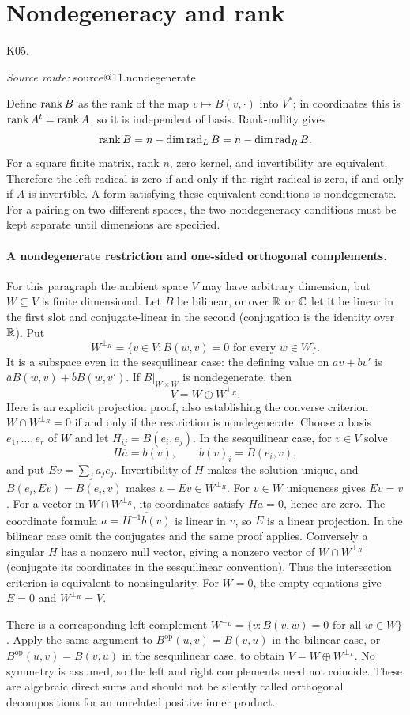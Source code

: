 \documentclass[11pt,a4paper]{book}
\makeatletter
\theoremstyle{definition}\newtheorem{definition}[theorem]{Definition}
\theoremstyle{remark}\newtheorem{remark}[theorem]{Remark}
\newcommand{\Kentry}[2]{\section{#2}\label{k:#1}\noindent\textsf{\small K05.\detokenize{#1}}\par
  \begingroup\small\color{black!65}\textit{Source route: }\csname source@#1\endcsname\par\endgroup}
\makeatother
\begin{document}
\Kentry{11.nondegenerate}{Nondegeneracy and rank}
Define $\operatorname{rank} B$ as the rank of the map $v\mapsto B(v,\cdot)$ into $V^*$; in coordinates this is $\operatorname{rank} A^t=\operatorname{rank} A$, so it is independent of basis. Rank-nullity gives
\[\operatorname{rank} B=n-\dim\operatorname{rad}_L B=n-\dim\operatorname{rad}_R B.
\]
For a square finite matrix, rank $n$, zero kernel, and invertibility are equivalent. Therefore the left radical is zero if and only if the right radical is zero, if and only if $A$ is invertible. A form satisfying these equivalent conditions is nondegenerate. For a pairing on two different spaces, the two nondegeneracy conditions must be kept separate until dimensions are specified.

\paragraph{A nondegenerate restriction and one-sided orthogonal complements.}
For this paragraph the ambient space $V$ may have arbitrary dimension, but $W\subseteq V$ is finite dimensional. Let $B$ be bilinear, or over $\mathbb R$ or $\mathbb C$ let it be linear in the first slot and conjugate-linear in the second (conjugation is the identity over $\mathbb R$). Put
\[W^{\perp_R}=\{v\in V:B(w,v)=0\text{ for every }w\in W\}.
\]
It is a subspace even in the sesquilinear case: the defining value on $av+bv'$ is $\overline aB(w,v)+\overline bB(w,v')$. If $B|_{W\times W}$ is nondegenerate, then
\[V=W\oplus W^{\perp_R}.
\]
Here is an explicit projection proof, also establishing the converse criterion $W\cap W^{\perp_R}=0$ if and only if the restriction is nondegenerate. Choose a basis $e_1,\ldots,e_r$ of $W$ and let $H_{ij}=B(e_i,e_j)$. In the sesquilinear case, for $v\in V$ solve
\[H\overline a=b(v),\qquad b(v)_i=B(e_i,v),
\]
and put $Ev=\sum_j a_je_j$. Invertibility of $H$ makes the solution unique, and $B(e_i,Ev)=B(e_i,v)$ makes $v-Ev\in W^{\perp_R}$. For $v\in W$ uniqueness gives $Ev=v$. For a vector in $W\cap W^{\perp_R}$, its coordinates satisfy $H\overline a=0$, hence are zero. The coordinate formula $a=\overline{H^{-1}b(v)}$ is linear in $v$, so $E$ is a linear projection. In the bilinear case omit the conjugates and the same proof applies. Conversely a singular $H$ has a nonzero null vector, giving a nonzero vector of $W\cap W^{\perp_R}$ (conjugate its coordinates in the sesquilinear convention). Thus the intersection criterion is equivalent to nonsingularity. For $W=0$, the empty equations give $E=0$ and $W^{\perp_R}=V$.

There is a corresponding left complement $W^{\perp_L}=\{v:B(v,w)=0\text{ for all }w\in W\}$. Apply the same argument to $B^{\mathrm{op}}(u,v)=B(v,u)$ in the bilinear case, or $B^{\mathrm{op}}(u,v)=\overline{B(v,u)}$ in the sesquilinear case, to obtain $V=W\oplus W^{\perp_L}$. No symmetry is assumed, so the left and right complements need not coincide. These are algebraic direct sums and should not be silently called orthogonal decompositions for an unrelated positive inner product.
\end{document}
